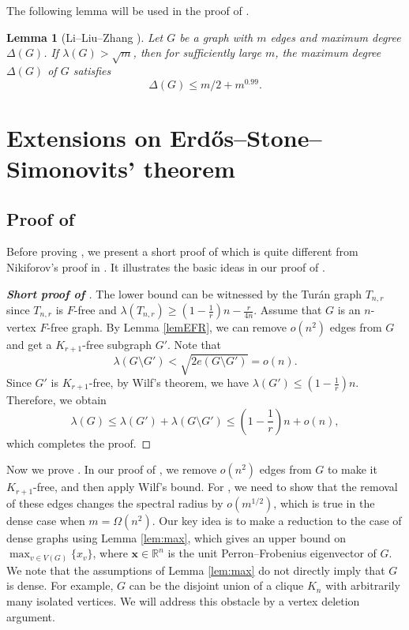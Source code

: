 \documentclass[11pt,a4paper]{article}
\newtheorem{lemma}[theorem]{Lemma}
\theoremstyle{definition}
\theoremstyle{remark}
\begin{document}
The following lemma will be used in the proof of . 

\begin{lemma}[Li--Liu--Zhang \cite{LLZ2024-book-qua}] \label{lem-Delta} 
 Let $G$ be a graph with $m$ edges and maximum degree $\Delta (G)$. 
If $\lambda (G)> \sqrt{m}$, then for sufficiently large $m$, the maximum degree $\Delta(G)$ of $G$ satisfies 
\[ \Delta (G)\le m/2 + m^{0.99}. \]
\end{lemma}









\section{Extensions on Erd\H{o}s--Stone--Simonovits' theorem}\label{sec:ESS}

\subsection{Proof of }  

Before proving , 
we present a short proof of  which is quite different from Nikiforov's proof in \cite{Niki2009cpc}. 
It illustrates the basic ideas in our proof of . 


\begin{proof}[{\bf Short proof of }]
The lower bound can be witnessed by the Tur\'{a}n graph $T_{n,r}$ since $T_{n,r}$ is $F$-free and $\lambda (T_{n,r}) \ge (1-\frac{1}{r})n- \frac{r}{4n}$. 
Assume that $G$ is an $n$-vertex $F$-free graph. 
By Lemma \ref{lemEFR}, we can remove $o(n^2)$ edges from 
$G$ and get a $K_{r+1}$-free subgraph $G'$. Note that 
\[ \lambda (G\setminus G') <  
 \sqrt{2e(G\setminus G')} = o(n). \]   
 Since $G'$ is $K_{r+1}$-free, by Wilf's theorem, we have $\lambda (G') \le \left(1- \frac{1}{r} \right) n$. 
 Therefore, we obtain 
\[ \lambda (G) \le \lambda (G') + \lambda (G\setminus G') 
\le \left( 1- \frac{1}{r} \right)n + o(n), \]
which completes the proof.  
\end{proof}



Now we prove . 
In our proof of , we remove $o(n^2)$ edges from $G$ 
to make it $K_{r+1}$-free, and then apply Wilf's bound. 
For , we need to show that the removal of these  edges changes the spectral radius by $o(m^{1/2})$, which is true in the dense case when $m=\Omega (n^2)$. Our key idea is to make a reduction to the case of dense graphs using Lemma \ref{lem:max}, which 
gives an upper bound on $\max_{v\in V(G)} \{x_v\}$, where $\bm{x}\in \mathbb{R}^n$ is the unit Perron--Frobenius eigenvector of $G$. 
We note that the assumptions of Lemma \ref{lem:max} do not directly imply that $G$ is dense. For example, $G$ can be the disjoint union of a clique $K_n$ with arbitrarily many isolated vertices. We will address this obstacle by a vertex deletion argument. 
\end{document}
